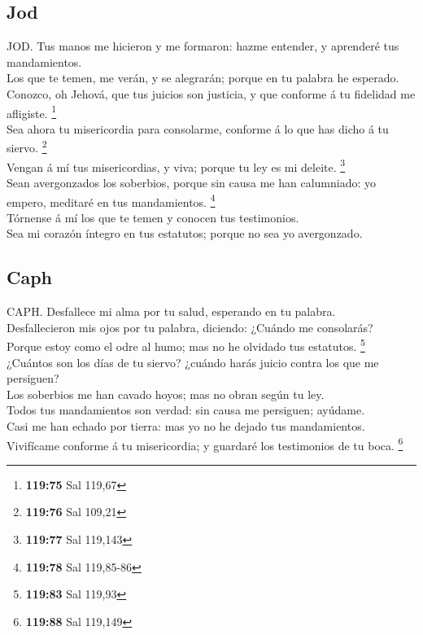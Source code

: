\hypertarget{jod}{%
\subsection{Jod}\label{jod}}

 JOD. Tus manos me hicieron y me formaron: hazme
entender, y aprenderé tus mandamientos.\\
 Los que te temen, me verán, y se alegrarán; porque en tu
palabra he esperado.\\
 Conozco, oh Jehová, que tus juicios son justicia, y que
conforme á tu fidelidad me afligiste. \footnote{\textbf{119:75} Sal
  119,67}\\
 Sea ahora tu misericordia para consolarme, conforme á lo
que has dicho á tu siervo. \footnote{\textbf{119:76} Sal 109,21}\\
 Vengan á mí tus misericordias, y viva; porque tu ley es
mi deleite. \footnote{\textbf{119:77} Sal 119,143}\\
 Sean avergonzados los soberbios, porque sin causa me han
calumniado: yo empero, meditaré en tus mandamientos. \footnote{\textbf{119:78}
  Sal 119,85-86}\\
 Tórnense á mí los que te temen y conocen tus
testimonios.\\
 Sea mi corazón íntegro en tus estatutos; porque no sea
yo avergonzado.

\hypertarget{caph}{%
\subsection{Caph}\label{caph}}

 CAPH. Desfallece mi alma por tu salud, esperando en tu
palabra.\\
 Desfallecieron mis ojos por tu palabra, diciendo:
¿Cuándo me consolarás?\\
 Porque estoy como el odre al humo; mas no he olvidado
tus estatutos. \footnote{\textbf{119:83} Sal 119,93}\\
 ¿Cuántos son los días de tu siervo? ¿cuándo harás juicio
contra los que me persiguen?\\
 Los soberbios me han cavado hoyos; mas no obran según tu
ley.\\
 Todos tus mandamientos son verdad: sin causa me
persiguen; ayúdame.\\
 Casi me han echado por tierra: mas yo no he dejado tus
mandamientos.\\
 Vivifícame conforme á tu misericordia; y guardaré los
testimonios de tu boca. \footnote{\textbf{119:88} Sal 119,149}

